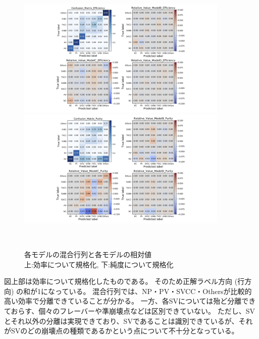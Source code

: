 \begin{figure}[htbp]
 \centering
  \begin{minipage}{1.0\textwidth}
   \centering
    \includegraphics[trim = 300 0 300 0, width=0.9\textwidth, clip]{Figure/3Networks/3-3-3-2ConfusionMatrix_1.png}
   \end{minipage}
   
   \begin{minipage}{1.0\textwidth}
   \centering
    \includegraphics[trim = 300 0 300 0, width=0.9\textwidth, clip]{Figure/3Networks/3-3-3-2ConfusionMatrix_2.png}
   \end{minipage}
  \caption{各モデルの混合行列と各モデルの相対値\\ 上:効率について規格化, 下:純度について規格化}
  \label{3-3-3-2ConfusionMatrix}
\end{figure}

図上部は効率について規格化したものである。
そのため正解ラベル方向 (行方向) の和が1になっている。
混合行列では、NP・PV・SVCC・Othersが比較的高い効率で分離できていることが分かる。
一方、各SVについては殆ど分離できておらす、個々のフレーバーや準崩壊点などは区別できていない。
ただし、SVとそれ以外の分離は実現できており、SVであることは識別できているが、それがSVのどの崩壊点の種類であるかという点について不十分となっている。

